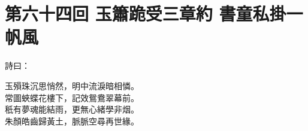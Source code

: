 
\chapter*{第六十四回 玉簫跪受三章約 書童私掛一帆風}


詩曰：

\begin{myquote} 
玉殞珠沉思悄然，明中流淚暗相憐。\\常圖蛺蝶花樓下，記效鴛鴦翠幕前。\\秖有夢魂能結雨，更無心緒學非烟。\\朱顏皓齒歸黃土，脈脈空尋再世緣。
\end{myquote} 

